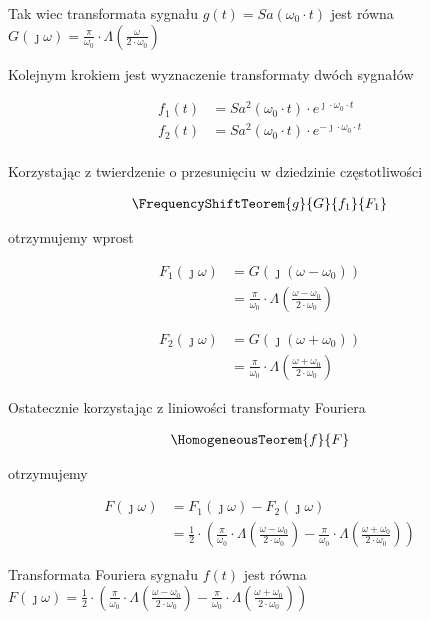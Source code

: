 \begin{task}
Tak wiec transformata sygnału $g(t)=Sa\left(\omega_0 \cdot t\right)$ jest równa $G(\jmath \omega)=\frac{\pi}{ \omega_0 } \cdot \Lambda\left( \frac{\omega}{2\cdot \omega_0}\right)$

Kolejnym krokiem jest wyznaczenie transformaty dwóch sygnałów

\begin{align*}
f_1(t)&=Sa^2\left(\omega_0 \cdot t\right) \cdot e^{\jmath \cdot \omega_0 \cdot t}\\
f_2(t)&=Sa^2\left(\omega_0 \cdot t\right) \cdot e^{-\jmath \cdot \omega_0 \cdot t}\\
\end{align*}

Korzystając z twierdzenie o przesunięciu w dziedzinie częstotliwości

\begin{align*}
\FrequencyShiftTeorem{g}{G}{f_1}{F_1}
\end{align*}

otrzymujemy wprost

\begin{align*}
F_1(\jmath \omega)&=G\left(\jmath \left(\omega -\omega_0\right)\right)\\
&=\frac{\pi}{ \omega_0 } \cdot \Lambda\left( \frac{\omega - \omega_0}{2\cdot \omega_0}\right)
\end{align*}

\begin{align*}
F_2(\jmath \omega)&=G\left(\jmath \left(\omega +\omega_0\right)\right)\\
&=\frac{\pi}{ \omega_0 } \cdot \Lambda\left( \frac{\omega + \omega_0}{2\cdot \omega_0}\right)
\end{align*}

Ostatecznie korzystając z liniowości transformaty Fouriera

\begin{align*}
\HomogeneousTeorem{f}{F}
\end{align*}

otrzymujemy

\begin{align*}
F(\jmath \omega)&=F_1(\jmath \omega)-F_2(\jmath \omega)\\
&=\frac{1}{2} \cdot \left( \frac{\pi}{ \omega_0 } \cdot \Lambda\left( \frac{\omega - \omega_0}{2\cdot \omega_0}\right) - \frac{\pi}{ \omega_0 } \cdot \Lambda\left( \frac{\omega + \omega_0}{2\cdot \omega_0}\right) \right)
\end{align*}


Transformata Fouriera sygnału $f(t)$ jest równa $F(\jmath \omega)=\frac{1}{2 } \cdot \left( \frac{\pi}{ \omega_0 } \cdot \Lambda\left( \frac{\omega - \omega_0}{2\cdot \omega_0}\right) - \frac{\pi}{ \omega_0 } \cdot \Lambda\left( \frac{\omega + \omega_0}{2\cdot \omega_0}\right) \right)$

\end{task}

